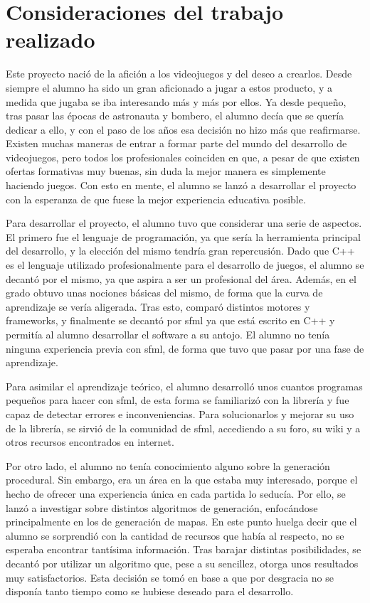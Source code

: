 \section{Consideraciones del trabajo realizado}

	Este proyecto nació de la afición a los videojuegos y del deseo a crearlos. Desde siempre el alumno ha sido un gran aficionado a jugar a estos producto, y a medida que jugaba se iba interesando más y más por ellos. Ya desde pequeño, tras pasar las épocas de astronauta y bombero, el alumno decía que se quería dedicar a ello, y con el paso de los años esa decisión no hizo más que reafirmarse. Existen muchas maneras de entrar a formar parte del mundo del desarrollo de videojuegos, pero todos los profesionales coinciden en que, a pesar de que existen ofertas formativas muy buenas, sin duda la mejor manera es simplemente haciendo juegos. Con esto en mente, el alumno se lanzó a desarrollar el proyecto con la esperanza de que fuese la mejor experiencia educativa posible.

	Para desarrollar el proyecto, el alumno tuvo que considerar una serie de aspectos. El primero fue el lenguaje de programación, ya que sería la herramienta principal del desarrollo, y la elección del mismo tendría gran repercusión. Dado que C++ es el lenguaje utilizado profesionalmente para el desarrollo de juegos, el alumno se decantó por el mismo, ya que aspira a ser un profesional del área. Además, en el grado obtuvo unas nociones básicas del mismo, de forma que la curva de aprendizaje se vería aligerada. Tras esto, comparó distintos motores y frameworks, y finalmente se decantó por \acrshort{sfml} ya que está escrito en C++ y permitía al alumno desarrollar el software a su antojo. El alumno no tenía ninguna experiencia previa con \acrshort{sfml}, de forma que tuvo que pasar por una fase de aprendizaje.

	Para asimilar el aprendizaje teórico, el alumno desarrolló unos cuantos programas pequeños para hacer con \acrshort{sfml}, de esta forma se familiarizó con la librería y fue capaz de detectar errores e inconveniencias. Para solucionarlos y mejorar su uso de la librería, se sirvió de la comunidad de \acrshort{sfml}, accediendo a su foro, su wiki y a otros recursos encontrados en internet.

	Por otro lado, el alumno no tenía conocimiento alguno sobre la generación procedural. Sin embargo, era un área en la que estaba muy interesado, porque el hecho de ofrecer una experiencia única en cada partida lo seducía. Por ello, se lanzó a investigar sobre distintos algoritmos de generación, enfocándose principalmente en los de generación de mapas. En este punto huelga decir que el alumno se sorprendió con la cantidad de recursos que había al respecto, no se esperaba encontrar tantísima información. Tras barajar distintas posibilidades, se decantó por utilizar un algoritmo que, pese a su sencillez, otorga unos resultados muy satisfactorios. Esta decisión se tomó en base a que por desgracia no se disponía tanto tiempo como se hubiese deseado para el desarrollo.

